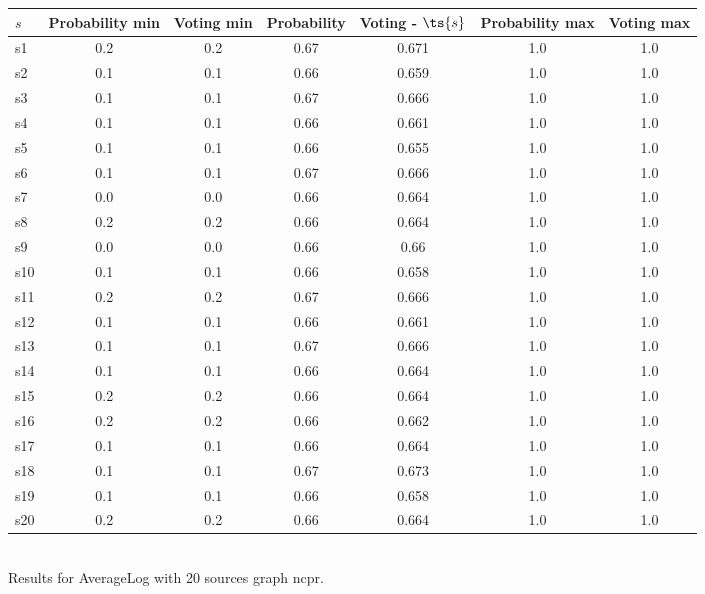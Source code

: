 \documentclass{article}
\begin{document}
\noindent\begin{tabular}{|l|c|c|c|c|c|c|}
\hline
$s$& Probability min & Voting min & Probability & Voting - $\ts{s}$ & Probability max & Voting max\\
\hline
s1 &0.2 & 0.2 & 0.67 & 0.671 & 1.0 & 1.0\\
\hline
s2 &0.1 & 0.1 & 0.66 & 0.659 & 1.0 & 1.0\\
\hline
s3 &0.1 & 0.1 & 0.67 & 0.666 & 1.0 & 1.0\\
\hline
s4 &0.1 & 0.1 & 0.66 & 0.661 & 1.0 & 1.0\\
\hline
s5 &0.1 & 0.1 & 0.66 & 0.655 & 1.0 & 1.0\\
\hline
s6 &0.1 & 0.1 & 0.67 & 0.666 & 1.0 & 1.0\\
\hline
s7 &0.0 & 0.0 & 0.66 & 0.664 & 1.0 & 1.0\\
\hline
s8 &0.2 & 0.2 & 0.66 & 0.664 & 1.0 & 1.0\\
\hline
s9 &0.0 & 0.0 & 0.66 & 0.66 & 1.0 & 1.0\\
\hline
s10 &0.1 & 0.1 & 0.66 & 0.658 & 1.0 & 1.0\\
\hline
s11 &0.2 & 0.2 & 0.67 & 0.666 & 1.0 & 1.0\\
\hline
s12 &0.1 & 0.1 & 0.66 & 0.661 & 1.0 & 1.0\\
\hline
s13 &0.1 & 0.1 & 0.67 & 0.666 & 1.0 & 1.0\\
\hline
s14 &0.1 & 0.1 & 0.66 & 0.664 & 1.0 & 1.0\\
\hline
s15 &0.2 & 0.2 & 0.66 & 0.664 & 1.0 & 1.0\\
\hline
s16 &0.2 & 0.2 & 0.66 & 0.662 & 1.0 & 1.0\\
\hline
s17 &0.1 & 0.1 & 0.66 & 0.664 & 1.0 & 1.0\\
\hline
s18 &0.1 & 0.1 & 0.67 & 0.673 & 1.0 & 1.0\\
\hline
s19 &0.1 & 0.1 & 0.66 & 0.658 & 1.0 & 1.0\\
\hline
s20 &0.2 & 0.2 & 0.66 & 0.664 & 1.0 & 1.0\\
\hline
\end{tabular}\\

\noindent Results for AverageLog with 20 sources graph ncpr.
\end{document}
